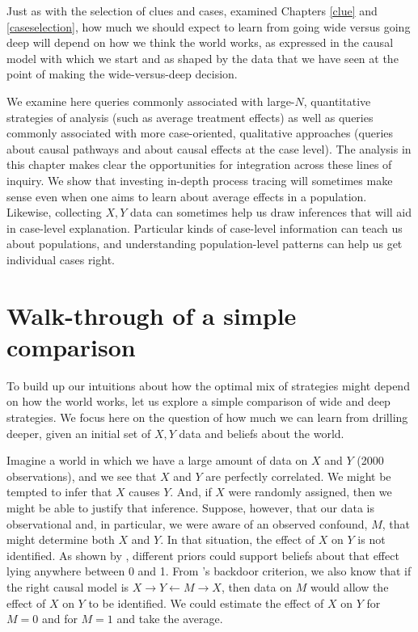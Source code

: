 \documentclass[
  12pt,
]{book}
\begin{document}
Just as with the selection of clues and cases, examined Chapters \ref{clue} and \ref{caseselection}, how much we should expect to learn from going wide versus going deep will depend on how we think the world works, as expressed in the causal model with which we start and as shaped by the data that we have seen at the point of making the wide-versus-deep decision.

We examine here queries commonly associated with large-\(N\), quantitative strategies of analysis (such as average treatment effects) as well as queries commonly associated with more case-oriented, qualitative approaches (queries about causal pathways and about causal effects at the case level). The analysis in this chapter makes clear the opportunities for integration across these lines of inquiry. We show that investing in-depth process tracing will sometimes make sense even when one aims to learn about average effects in a population. Likewise, collecting \(X, Y\) data can sometimes help us draw inferences that will aid in case-level explanation. Particular kinds of case-level information can teach us about populations, and understanding population-level patterns can help us get individual cases right.

\hypertarget{walk-through-of-a-simple-comparison}{%
\section{Walk-through of a simple comparison}\label{walk-through-of-a-simple-comparison}}

To build up our intuitions about how the optimal mix of strategies might depend on how the world works, let us explore a simple comparison of wide and deep strategies. We focus here on the question of how much we can learn from drilling deeper, given an initial set of \(X,Y\) data and beliefs about the world.

Imagine a world in which we have a large amount of data on \(X\) and \(Y\) (2000 observations), and we see that \(X\) and \(Y\) are perfectly correlated. We might be tempted to infer that \(X\) causes \(Y\). And, if \(X\) were randomly assigned, then we might be able to justify that inference. Suppose, however, that our data is observational and, in particular, we were aware of an observed confound, \(M\), that might determine both \(X\) and \(Y\). In that situation, the effect of \(X\) on \(Y\) is not identified. As shown by \citet{manski1995identification}, different priors could support beliefs about that effect lying anywhere between 0 and 1. From \citet{pearl2009causality}'s backdoor criterion, we also know that if the right causal model is \(X \rightarrow Y \leftarrow M \rightarrow X\), then data on \(M\) would allow the effect of \(X\) on \(Y\) to be identified. We could estimate the effect of \(X\) on \(Y\) for \(M=0\) and for \(M=1\) and take the average.
\end{document}
